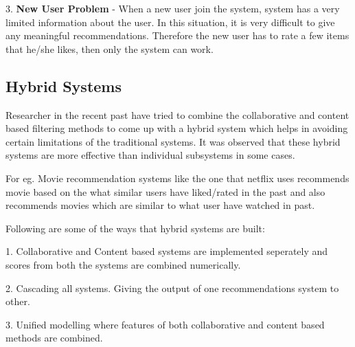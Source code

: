3. {\bf New User Problem} - When a new user join the system, system has a very limited information about the user. In this situation, it is very difficult to give any meaningful recommendations. Therefore the new user has to rate a few items that he/she likes, then only the system can work. 

\subsection{Hybrid Systems}
Researcher in the recent past have tried to combine the collaborative and content based filtering methods to come up with a hybrid system which helps in avoiding certain limitations of the traditional systems. It was observed that these hybrid systems are more effective than individual subsystems in some cases.

For eg. Movie recommendation systems like the one that netflix uses recommends movie based on the what similar users have liked/rated in the past and also recommends movies which are similar to what user have watched in past.

Following are some of the ways that hybrid systems are built:

1. Collaborative and Content based systems are implemented seperately and scores from both the systems are combined numerically.

2. Cascading all systems. Giving the output of one recommendations system to other.

3. Unified modelling where features of both collaborative and content based methods are combined. 
